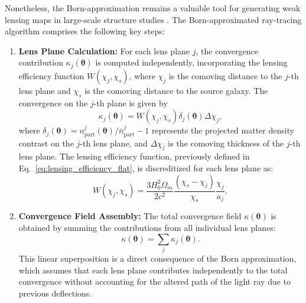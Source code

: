 Nonetheless, the Born-approximation remains a valuable tool for generating weak lensing maps in large-scale structure studies \citep{2008MNRAS.391..435F, 2009A&A...499...31H, 2015MNRAS.447.1319F}.
The Born-approximated ray-tracing algorithm comprises the following key steps:

\begin{enumerate}
    \item \textbf{Lens Plane Calculation:} 
    For each lens plane $j$, the convergence contribution $\kappa_j(\boldsymbol{\theta})$ is computed independently, incorporating the lensing efficiency function $W(\chi_j, \chi_s)$, where $\chi_j$ is the comoving distance to the $j$-th lens plane and $\chi_s$ is the comoving distance to the source galaxy. The convergence on the $j$-th plane is given by
    \begin{equation}
        \kappa_j(\boldsymbol{\theta}) = W(\chi_j, \chi_s) \delta_j(\boldsymbol{\theta}) \Delta \chi_j,
        \label{eq:kappa_born}
    \end{equation}
    where $\delta_j(\boldsymbol{\theta}) = n_{\mathrm{part}}^j(\boldsymbol{\theta}) / \bar{n}_{\mathrm{part}}^j - 1$ represents the projected matter density contrast on the $j$-th lens plane, and $\Delta \chi_j$ is the comoving thickness of the $j$-th lens plane. The lensing efficiency function, previously defined in Eq.~\eqref{eq:lensing_efficiency_flat}, is discreditized for each lens plane as:
    \begin{equation}
        W(\chi_j, \chi_s) = \frac{3 H_0^2 \Omega_m}{2 c^2} \frac{( \chi_s - \chi_j )}{ \chi_s } \frac{ \chi_j }{ a_j },
    \end{equation}

    \item \textbf{Convergence Field Assembly:} 
    The total convergence field $\kappa(\boldsymbol{\theta})$ is obtained by summing the contributions from all individual lens planes:
    \begin{equation}
        \kappa(\boldsymbol{\theta}) = \sum_{j} \kappa_j(\boldsymbol{\theta}).
        \label{eq:total_kappa}
    \end{equation}
    This linear superposition is a direct consequence of the Born approximation, which assumes that each lens plane contributes independently to the total convergence without accounting for the altered path of the light ray due to previous deflections.

\end{enumerate}
